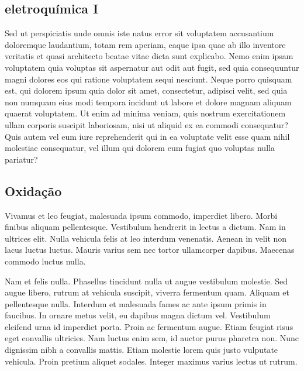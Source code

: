 \documentclass[12pt]{article}
\begin{document}
    \begin{multicols*}{2}
        
        \section*{eletroquímica I}
        Sed ut perspiciatis unde omnis iste natus error sit voluptatem accusantium doloremque laudantium, 
        totam rem aperiam, eaque ipsa quae ab illo inventore veritatis et quasi architecto beatae vitae dicta 
        sunt explicabo. Nemo enim ipsam voluptatem quia voluptas sit aspernatur aut odit aut fugit, sed quia 
        consequuntur magni dolores eos qui ratione voluptatem sequi nesciunt. Neque porro quisquam est, qui 
        dolorem ipsum quia dolor sit amet, consectetur, adipisci velit, sed quia non numquam eius modi 
        tempora incidunt ut labore et dolore magnam aliquam quaerat voluptatem. Ut enim ad minima veniam, 
        quis nostrum exercitationem ullam corporis suscipit laboriosam, nisi ut aliquid ex ea commodi 
        consequatur? Quis autem vel eum iure reprehenderit qui in ea voluptate velit esse quam nihil molestiae 
        consequatur, vel illum qui dolorem eum fugiat quo voluptas nulla pariatur?
        
        \subsection*{Oxidação}
        Vivamus et leo feugiat, malesuada ipsum commodo, imperdiet libero. Morbi finibus aliquam pellentesque. 
        Vestibulum hendrerit in lectus a dictum. Nam in ultrices elit. Nulla vehicula felis at leo interdum 
        venenatis. Aenean in velit non lacus luctus luctus. Mauris varius sem nec tortor ullamcorper dapibus. 
        Maecenas commodo luctus nulla.
        
        Nam et felis nulla. Phasellus tincidunt nulla ut augue vestibulum molestie. Sed augue libero, rutrum 
        at vehicula suscipit, viverra fermentum quam. Aliquam et pellentesque nulla. Interdum et malesuada 
        fames ac ante ipsum primis in faucibus. In ornare metus velit, eu dapibus magna dictum vel. 
        Vestibulum eleifend urna id imperdiet porta. Proin ac fermentum augue. Etiam feugiat risus eget 
        convallis ultricies. Nam luctus enim sem, id auctor purus pharetra non. Nunc dignissim nibh a 
        convallis mattis. Etiam molestie lorem quis justo vulputate vehicula. Proin pretium aliquet sodales. 
        Integer maximus varius lectus ut rutrum.
        

\end{multicols*}
\end{document}

